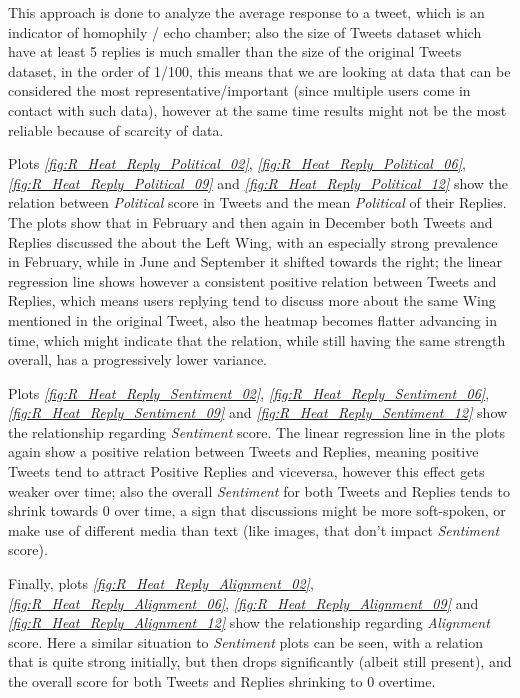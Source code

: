 \documentclass[twoside,twocolumn]{article}
\begin{document}
	This approach is done to analyze the average response to a tweet, which is an indicator of homophily / echo chamber; also the size of Tweets dataset which have at least 5 replies is much smaller than the size of the original Tweets dataset, in the order of 1/100, this means that we are looking at data that can be considered the most representative/important (since multiple users come in contact with such data), however at the same time results might not be the most reliable because of scarcity of data.
	
	Plots \textit{\ref{fig:R_Heat_Reply_Political_02}}, \textit{\ref{fig:R_Heat_Reply_Political_06}}, \textit{\ref{fig:R_Heat_Reply_Political_09}} and \textit{\ref{fig:R_Heat_Reply_Political_12}} show the relation between \textit{Political} score in Tweets and the mean \textit{Political} of their Replies.
	The plots show that in February and then again in December both Tweets and Replies discussed the about the Left Wing, with an especially strong prevalence in February, while in June and September it shifted towards the right; the linear regression line shows however a consistent positive relation between Tweets and Replies, which means users replying tend to discuss more about the same Wing mentioned in the original Tweet, also the heatmap becomes flatter advancing in time, which might indicate that the relation, while still having the same strength overall, has a progressively lower variance.
	
	Plots \textit{\ref{fig:R_Heat_Reply_Sentiment_02}}, \textit{\ref{fig:R_Heat_Reply_Sentiment_06}}, \textit{\ref{fig:R_Heat_Reply_Sentiment_09}} and \textit{\ref{fig:R_Heat_Reply_Sentiment_12}} show the relationship regarding \textit{Sentiment} score.
	The linear regression line in the plots again show a positive relation between Tweets and Replies, meaning positive Tweets tend to attract Positive Replies and viceversa, however this effect gets weaker over time; also the overall \textit{Sentiment} for both Tweets and Replies tends to shrink towards 0 over time, a sign that discussions might be more soft-spoken, or make use of different media than text (like images, that don't impact \textit{Sentiment} score).
	
	Finally, plots \textit{\ref{fig:R_Heat_Reply_Alignment_02}}, \textit{\ref{fig:R_Heat_Reply_Alignment_06}}, \textit{\ref{fig:R_Heat_Reply_Alignment_09}} and \textit{\ref{fig:R_Heat_Reply_Alignment_12}} show the relationship regarding \textit{Alignment} score.
	Here a similar situation to \textit{Sentiment} plots can be seen, with a relation that is quite strong initially, but then drops significantly (albeit still present), and the overall score for both Tweets and Replies shrinking to 0 overtime.
	
\end{document}
